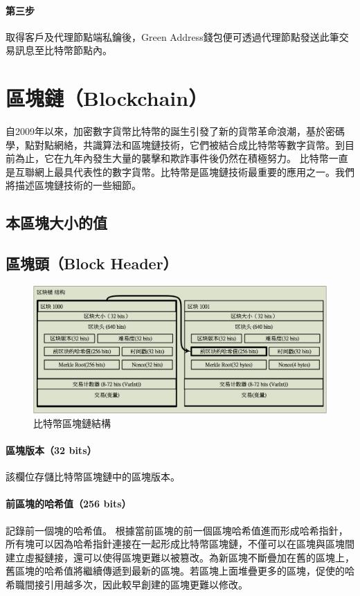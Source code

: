 		 	\paragraph{第三步}取得客戶及代理節點端私鑰後，Green Address錢包便可透過代理節點發送此筆交易訊息至比特幣節點內。



	\section{區塊鏈（Blockchain）}
	自2009年以來，加密數字貨幣比特幣的誕生引發了新的貨幣革命浪潮，基於密碼學，點對點網絡，共識算法和區塊鏈技術，它們被結合成比特幣等數字貨幣。到目前為止，它在九年內發生大量的襲擊和欺詐事件後仍然在積極努力。 比特幣一直是互聯網上最具代表性的數字貨幣。比特幣是區塊鏈技術最重要的應用之一。我們將描述區塊鏈技術的一些細節。

		\subsection{本區塊大小的值 }
		\subsection{區塊頭（Block Header）}

		\begin{figure}[h]
			\centering
			\includegraphics[width = 1\textwidth]{blockchain.png}
			\caption{比特幣區塊鏈結構}\label{blockchain}
		\end{figure}

			\paragraph{區塊版本（32 bits）}該欄位存儲比特幣區塊鏈中的區塊版本。
			\paragraph{前區塊的哈希值（256 bits）}記錄前一個塊的哈希值。 根據當前區塊的前一個區塊哈希值進而形成哈希指針，所有塊可以因為哈希指針連接在一起形成比特幣區塊鏈，不僅可以在區塊與區塊間建立虛擬鏈接，還可以使得區塊更難以被篡改。為新區塊不斷疊加在舊的區塊上，舊區塊的哈希值將繼續傳遞到最新的區塊。若區塊上面堆疊更多的區塊，促使的哈希職間接引用越多次，因此較早創建的區塊更難以修改。
